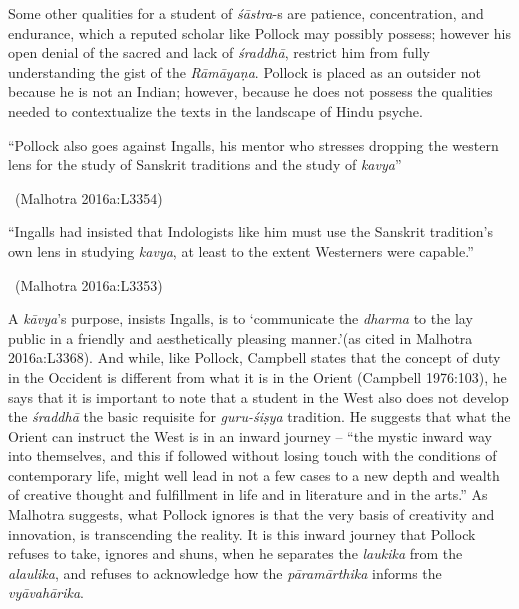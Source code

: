 Some other qualities for a student of \textit{śāstra}-s are patience, concentration, and endurance, which a reputed scholar like Pollock may possibly possess; however his open denial of the sacred and lack of \textit{śraddhā}, restrict him from fully understanding the gist of the \textit{Rāmāyaṇa}. Pollock is placed as an outsider not because he is not an Indian; however, because he does not possess the qualities needed to contextualize the texts in the landscape of Hindu psyche.

\newpage

\begin{myquote}
“Pollock also goes against Ingalls, his mentor who stresses dropping the western lens for the study of Sanskrit traditions and the study of \textit{kavya}” 

~\hfill (Malhotra 2016a:L3354)
\end{myquote}

\begin{myquote}
“Ingalls had insisted that Indologists like him must use the Sanskrit tradition’s own lens in studying \textit{kavya}, at least to the extent Westerners were capable.” 

\vskip -7pt

~\hfill (Malhotra 2016a:L3353)
\end{myquote}

A \textit{kāvya}’s purpose, insists Ingalls, is to ‘communicate the \textit{dharma} to the lay public in a friendly and aesthetically pleasing manner.’(as cited in Malhotra 2016a:L3368). And while, like Pollock, Campbell states that the concept of duty in the Occident is different from what it is in the Orient (Campbell 1976:103), he says that it is important to note that a student in the West also does not develop the \textit{śraddhā} the basic requisite for \textit{guru-śiṣya} tradition. He suggests that what the Orient can instruct the West is in an inward journey – “the mystic inward way into themselves, and this if followed without losing touch with the conditions of contemporary life, might well lead in not a few cases to a new depth and wealth of creative thought and fulfillment in life and in literature and in the arts.” As Malhotra suggests, what Pollock ignores is that the very basis of creativity and innovation, is transcending the reality. It is this inward journey that Pollock refuses to take, ignores and shuns, when he separates the \textit{laukika} from the \textit{alaulika}, and refuses to acknowledge how the \textit{pāramārthika} informs the \textit{vyāvahārika}.

